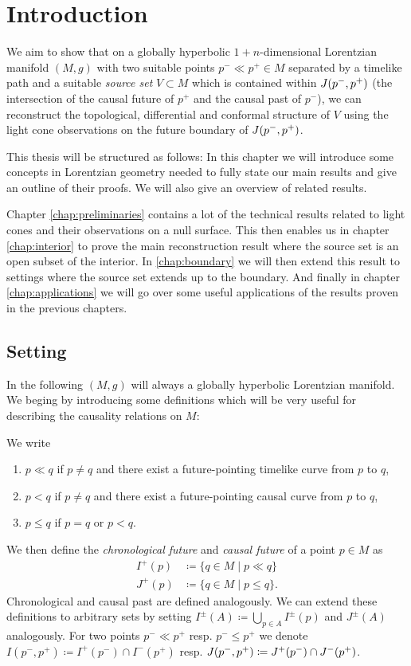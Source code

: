 \chapter{Introduction}

We aim to show that on a globally hyperbolic $1+n$-dimensional Lorentzian manifold $(M,g)$ with two suitable points $p^-\ll p^+\in M$ separated by a timelike path and a suitable \emph{source set} $V\subset M$ which is contained within $J(p^-,p^+)$ (the intersection of the causal future of $p^+$ and the causal past of $p^-$), we can reconstruct the topological, differential and conformal structure of $V$ using the light cone observations on the future boundary of $J(p^-,p^+)$. 

This thesis will be structured as follows: In this chapter we will introduce some concepts in Lorentzian geometry needed to fully state our main results and give an outline of their proofs. We will also give an overview of related results.

Chapter \ref{chap:preliminaries} contains a lot of the technical results related to light cones and their observations on a null surface. This then enables us in chapter \ref{chap:interior} to prove the main reconstruction result where the source set is an open subset of the interior. In \ref{chap:boundary} we will then extend this result to settings where the source set extends up to the boundary. And finally in chapter \ref{chap:applications} we will go over some useful applications of the results proven in the previous chapters.

\section{Setting}
In the following $(M,g)$ will always a globally hyperbolic Lorentzian manifold. We beging by introducing some definitions which will be very useful for describing the causality relations on $M$:
\begin{definition}\label{def:causalrelations}
    We write
    \begin{enumerate}
        \item $p\ll q$ if $p\neq q$ and there exist a future-pointing timelike curve from $p$ to $q$,
        \item $p<q$ if $p\neq q$ and there exist a future-pointing causal curve from $p$ to $q$,
        \item $p\leq q$ if $p=q$ or $p<q$.
    \end{enumerate}
    We then define the \emph{chronological future} and \emph{causal future} of a point $p\in M$ as
    \begin{align*}
        I^+(p) &\coloneqq \{q\in M \mid p\ll q\}\\
        J^+(p) &\coloneqq \{q\in M \mid p\leq q\}.
    \end{align*} Chronological and causal past are defined analogously.
    We can extend these definitions to arbitrary sets by setting $I^\pm(A)\coloneqq\bigcup_{p\in A}I^\pm(p)$ and $J^\pm(A)$ analogously. For two points $p^-\ll p^+$ resp. $p^-\leq p^+$ we denote $I(p^-,p^+)\coloneqq I^+(p^-)\cap I^-(p^+)$ resp. $J(p^-,p^+)\coloneqq J^+(p^-)\cap J^-(p^+)$.
\end{definition}

